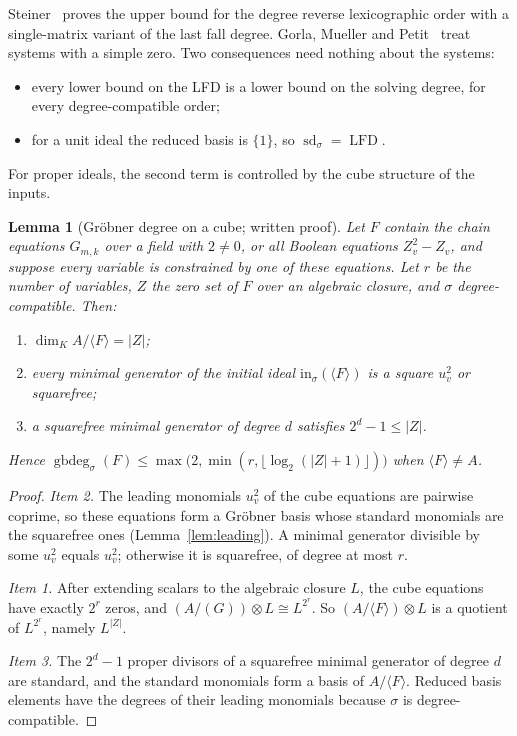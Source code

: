\documentclass[11pt]{article}
\newtheorem{lemma}[theorem]{Lemma}
\theoremstyle{definition}\newtheorem{definition}[theorem]{Definition}
\theoremstyle{remark}\newtheorem{remark}[theorem]{Remark}
\newcommand{\lfd}{\operatorname{LFD}}
\newcommand{\sd}{\operatorname{sd}}
\newcommand{\gbdeg}{\operatorname{gbdeg}}
\newcommand{\Id}{\langle F\rangle}
\begin{document}
Steiner~\cite[Lemma~7.4]{steiner24} proves the upper bound for the degree
reverse lexicographic order with a single-matrix variant of the last fall
degree. Gorla, Mueller and Petit~\cite[Thm.~4]{gmp21} treat systems with a
simple zero. Two consequences need nothing about the systems:
\begin{itemize}
\item every lower bound on the LFD is a lower bound on the solving degree,
 for every degree-compatible order;
\item for a unit ideal the reduced basis is $\{1\}$, so $\sd_\sigma=\lfd$.
\end{itemize}
For proper ideals, the second term is controlled by the cube structure of
the inputs.

\begin{lemma}[Gr\"obner degree on a cube; written proof]\label{lem:cube}
Let $F$ contain the chain equations $G_{m,k}$ over a field with $2\ne0$,
or all Boolean equations $Z_v^2-Z_v$, and suppose every variable is constrained by one of
these equations. Let $r$ be the number of variables,
$Z$ the zero set of $F$ over an algebraic closure, and $\sigma$
degree-compatible. Then:
\begin{enumerate}
\item $\dim_K A/\Id=|Z|$;
\item every minimal generator of the initial ideal $\mathrm{in}_\sigma(\Id)$
 is a square $u_v^2$ or squarefree;
\item a squarefree minimal generator of degree $d$ satisfies $2^d-1\le|Z|$.
\end{enumerate}
Hence $\gbdeg_\sigma(F)\le\max\bigl(2,\min(r,\lfloor\log_2(|Z|+1)\rfloor)\bigr)$
when $\Id\ne A$.
\end{lemma}
\begin{proof}
\emph{Item 2.} The leading monomials $u_v^2$ of the cube equations are
pairwise coprime, so these equations form a Gr\"obner basis whose standard
monomials are the squarefree ones (Lemma~\ref{lem:leading}). A minimal
generator divisible by some $u_v^2$ equals $u_v^2$; otherwise it is
squarefree, of degree at most $r$.

\emph{Item 1.} After extending scalars to the algebraic closure $L$, the
cube equations have exactly $2^r$ zeros, and
$(A/(G))\otimes L\cong L^{2^r}$. So $(A/\Id)\otimes L$ is a quotient of
$L^{2^r}$, namely $L^{|Z|}$.

\emph{Item 3.} The $2^d-1$ proper divisors of a squarefree minimal
generator of degree $d$ are standard, and the standard monomials form a
basis of $A/\Id$. Reduced basis elements have the degrees of their leading
monomials because $\sigma$ is degree-compatible.
\end{proof}
\end{document}
